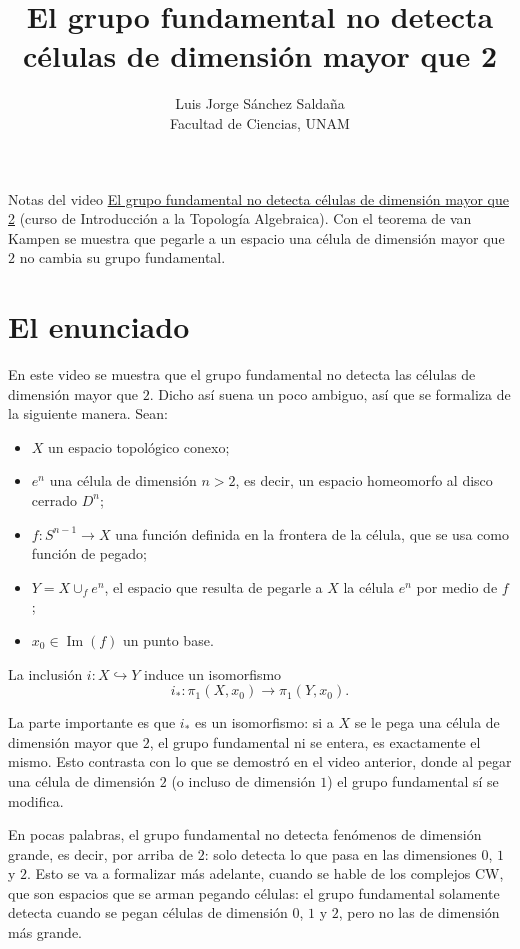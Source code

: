 \documentclass[11pt]{article}
\title{El grupo fundamental no detecta células de dimensión mayor que 2}
\author{Luis Jorge Sánchez Saldaña\\[2pt]\small Facultad de Ciencias, UNAM}
\date{}
\begin{document}
\maketitle

\noindent\small Notas del video
\href{https://www.youtube.com/watch?v=92qAWfRY5KE}{\guillemotleft{}El grupo fundamental no detecta células de dimensión mayor que 2\guillemotright{}}
(curso de Introducción a la Topología Algebraica). Con el teorema de van Kampen se muestra que pegarle a un espacio una célula de dimensión mayor que $2$ no cambia su grupo fundamental.
\normalsize

\section*{El enunciado}

En este video se muestra que el grupo fundamental no detecta las células de dimensión mayor que $2$. Dicho así suena un poco ambiguo, así que se formaliza de la siguiente manera. Sean:
\begin{itemize}
  \item $X$ un espacio topológico conexo;
  \item $e^n$ una célula de dimensión $n>2$, es decir, un espacio homeomorfo al disco cerrado $D^n$;
  \item $f\colon S^{n-1}\to X$ una función definida en la frontera de la célula, que se usa como función de pegado;
  \item $Y=X\cup_f e^n$, el espacio que resulta de pegarle a $X$ la célula $e^n$ por medio de $f$;
  \item $x_0\in\operatorname{Im}(f)$ un punto base.
\end{itemize}

\begin{teo}\label{teo:no-detecta}
La inclusión $i\colon X\hookrightarrow Y$ induce un isomorfismo
\[
  i_*\colon\pi_1(X,x_0)\to\pi_1(Y,x_0).
\]
\end{teo}

La parte importante es que $i_*$ es un isomorfismo: si a $X$ se le pega una célula de dimensión mayor que $2$, el grupo fundamental ni se entera, es exactamente el mismo. Esto contrasta con lo que se demostró en el video anterior, donde al pegar una célula de dimensión $2$ (o incluso de dimensión $1$) el grupo fundamental sí se modifica.

En pocas palabras, el grupo fundamental no detecta fenómenos de dimensión grande, es decir, por arriba de $2$: solo detecta lo que pasa en las dimensiones $0$, $1$ y $2$. Esto se va a formalizar más adelante, cuando se hable de los complejos CW, que son espacios que se arman pegando células: el grupo fundamental solamente detecta cuando se pegan células de dimensión $0$, $1$ y $2$, pero no las de dimensión más grande.
\end{document}
